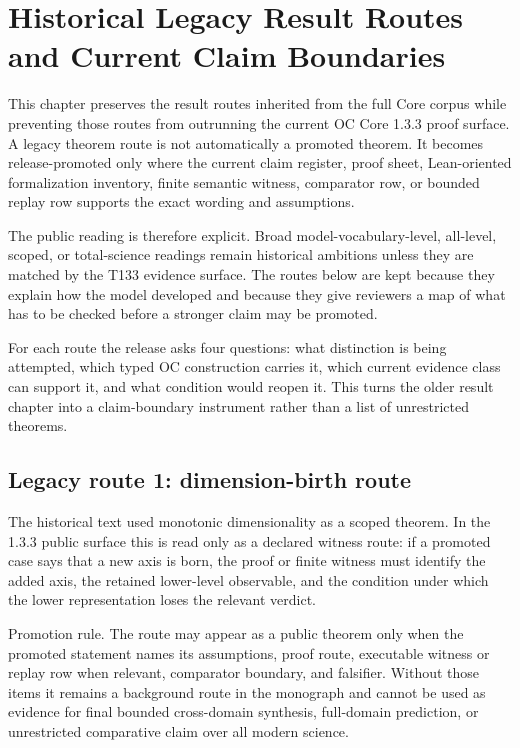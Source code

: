 
\section{Historical Legacy Result Routes and Current Claim Boundaries}

\label{sec:results}

This chapter preserves the result routes inherited from the full Core corpus while preventing those routes from outrunning the current OC Core 1.3.3 proof surface. A legacy theorem route is not automatically a promoted theorem. It becomes release-promoted only where the current claim register, proof sheet, Lean-oriented formalization inventory, finite semantic witness, comparator row, or bounded replay row supports the exact wording and assumptions.


The public reading is therefore explicit. Broad model-vocabulary-level, all-level, scoped, or total-science readings remain historical ambitions unless they are matched by the T133 evidence surface. The routes below are kept because they explain how the model developed and because they give reviewers a map of what has to be checked before a stronger claim may be promoted.


For each route the release asks four questions: what distinction is being attempted, which typed OC construction carries it, which current evidence class can support it, and what condition would reopen it. This turns the older result chapter into a claim-boundary instrument rather than a list of unrestricted theorems.


\subsection{Legacy route 1: dimension-birth route}

The historical text used monotonic dimensionality as a scoped theorem. In the 1.3.3 public surface this is read only as a declared witness route: if a promoted case says that a new axis is born, the proof or finite witness must identify the added axis, the retained lower-level observable, and the condition under which the lower representation loses the relevant verdict.


Promotion rule. The route may appear as a public theorem only when the promoted statement names its assumptions, proof route, executable witness or replay row when relevant, comparator boundary, and falsifier. Without those items it remains a background route in the monograph and cannot be used as evidence for final bounded cross-domain synthesis, full-domain prediction, or unrestricted comparative claim over all modern science.


